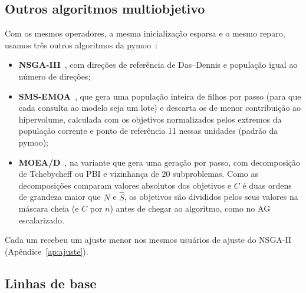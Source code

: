 \subsection{Outros algoritmos multiobjetivo}
\label{sec:outros-moea}

Com os mesmos operadores, a mesma inicialização esparsa e o mesmo reparo,
usamos três outros algoritmos da pymoo~\cite{blank2020pymoo}:
\begin{itemize}
  \item \textbf{NSGA-III}~\cite{deb2014nsga3}, com direções de referência de
        Das--Dennis e população igual ao número de direções;
  \item \textbf{SMS-EMOA}~\cite{beume2007smsemoa}, que gera uma população inteira
        de filhos por passo (para que cada consulta ao modelo seja um lote) e
        descarta os de menor contribuição ao hipervolume, calculada com os
        objetivos normalizados pelos extremos da população corrente e ponto de
        referência 11 nessas unidades (padrão da pymoo);
  \item \textbf{MOEA/D}~\cite{zhang2007moead}, na variante que gera uma geração
        por passo, com decomposição de Tchebycheff ou PBI e vizinhança de 20
        subproblemas. Como as decomposições comparam valores absolutos dos
        objetivos e $C$ é duas ordens de grandeza maior que $\hat N$ e $\hat S$,
        os objetivos são divididos pelos seus valores na máscara cheia (e $C$
        por $n$) antes de chegar ao algoritmo, como no AG escalarizado.
\end{itemize}
Cada um recebeu um ajuste menor nos mesmos usuários de ajuste do NSGA-II
(Apêndice~\ref{ap:ajuste}).

\subsection{Linhas de base}
\label{sec:base}

